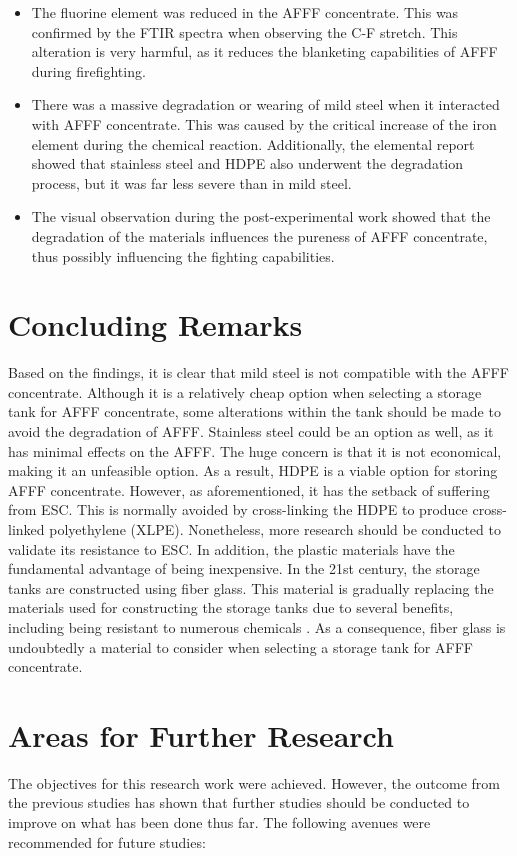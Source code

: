 \documentclass[12pt]{report}
\begin{document}
\begin{itemize}
    \item The fluorine element was reduced in the AFFF concentrate. This was confirmed by the FTIR spectra when observing the C-F stretch. This alteration is very harmful, as it reduces the blanketing capabilities of AFFF during firefighting.
    \item There was a massive degradation or wearing of mild steel when it interacted with AFFF concentrate. This was caused by the critical increase of the iron element during the chemical reaction. Additionally, the elemental report showed that stainless steel and HDPE also underwent the degradation process, but it was far less severe than in mild steel.
    \item The visual observation during the post-experimental work showed that the degradation of the materials influences the pureness of AFFF concentrate, thus possibly influencing the fighting capabilities.
\end{itemize}

\section{Concluding Remarks}
Based on the findings, it is clear that mild steel is not compatible with the AFFF concentrate. Although it is a relatively cheap option when selecting a storage tank for AFFF concentrate, some alterations within the tank should be made to avoid the degradation of AFFF. Stainless steel could be an option as well, as it has minimal effects on the AFFF. The huge concern is that it is not economical, making it an unfeasible option. As a result, HDPE is a viable option for storing AFFF concentrate. However, as aforementioned, it has the setback of suffering from ESC. This is normally avoided by cross-linking the HDPE to produce cross-linked polyethylene (XLPE). Nonetheless, more research should be conducted to validate its resistance to ESC. In addition, the plastic materials have the fundamental advantage of being inexpensive.
In the 21st century, the storage tanks are constructed using fiber glass. This material is gradually replacing the materials used for constructing the storage tanks due to several benefits, including being resistant to numerous chemicals \cite{avdeeva2016chemical}. As a consequence, fiber glass is undoubtedly a material to consider when selecting a storage tank for AFFF concentrate.

\section{Areas for Further Research}
The objectives for this research work were achieved. However, the outcome from the previous studies has shown that further studies should be conducted to improve on what has been done thus far. The following avenues were recommended for future studies: 
\end{document}
